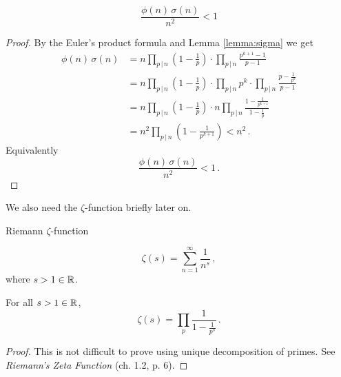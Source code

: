 \documentclass{article}
\begin{document}
\begin{lemma}
\label{thm:sigmafii}
\begin{equation*}
    \frac{\phi(n)\,\sigma(n)}{n^2}<1
\end{equation*}

\begin{proof}
By the Euler's product formula and Lemma \ref{lemma:sigma} we get
\begin{align*}
    \phi(n)\,\sigma(n) & = n\prod_{p\,\vert\, n}\left(1-\frac{1}{p}\right) \cdot \prod_{p\,\vert\, n} \frac{p^{k+1}-1}{p-1}\\
    & = n\prod_{p\,\vert\, n}\left(1-\frac{1}{p}\right) \cdot \prod_{p\,\vert\, n} p^k \cdot \prod_{p\,\vert\, n} \frac{p-\frac{1}{p^k}}{p-1}\\
    & = n\prod_{p\,\vert\, n}\left(1-\frac{1}{p}\right) \cdot n \prod_{p\,\vert\, n}\frac{1-\frac{1}{p^{k+1}}}{1-\frac{1}{p}}\\
    & = n^2 \prod_{p\,\vert\, n} \left(1-\frac{1}{p^{k+1}}\right) < n^2\,.
\end{align*}
Equivalently
\begin{equation*}
    \frac{\phi(n)\,\sigma(n)}{n^2}<1\,.
\end{equation*}
\end{proof}
\end{lemma}

We also need the $\zeta$-function briefly later on.

\begin{definition}
Riemann $\zeta$-function \emph{\cite{HardyWright}}

\begin{equation*}
    \zeta(s)=\sum_{n=1}^\infty \frac{1}{n^s}\,,
\end{equation*}
where $s>1\in\mathbb{R}$.
\end{definition}

\begin{lemma}
\label{lemma:zeta}
For all $s>1\in\mathbb{R}$, 
\begin{equation*}
    \zeta(s)=\prod_p \frac{1}{1-\frac{1}{p^s}}\,.
\end{equation*}
\begin{proof}
This is not difficult to prove using unique decomposition of primes. See \textit{Riemann's Zeta Function} \cite{Edwards} (ch. 1.2, p. 6).
\end{proof}
\end{lemma}
\end{document}
